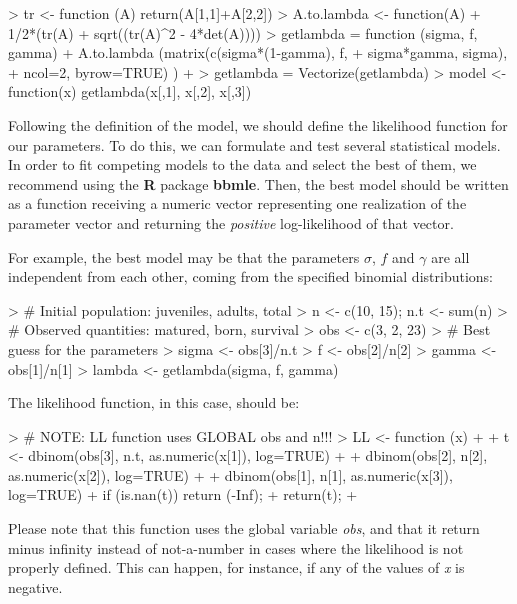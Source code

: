 \documentclass[twoside,12pt,a4paper]{article}
\newcommand{\R}{\textnormal{\sffamily\bfseries R}\xspace}
\begin{document}
\begin{Schunk}
\begin{Sinput}
> tr <- function (A) return(A[1,1]+A[2,2])
> A.to.lambda <- function(A) 
+   1/2*(tr(A) + sqrt((tr(A)^2 - 4*det(A))))
> getlambda = function (sigma, f, gamma) {
+   A.to.lambda (matrix(c(sigma*(1-gamma), f, 
+                         sigma*gamma, sigma), 
+                       ncol=2, byrow=TRUE) )
+ }
> getlambda = Vectorize(getlambda)
> model <- function(x) getlambda(x[,1], x[,2], x[,3])
\end{Sinput}
\end{Schunk}

Following the definition of the model, we should define the likelihood function for our parameters.
To do this, we can formulate and test several statistical models. In order to fit competing models to the 
data and select the best of them, we recommend using the \R package \textbf{bbmle}.
Then, the best model should be written as a function receiving a numeric vector representing one realization
of the parameter vector and returning the {\em positive} log-likelihood of that vector.

For example, the best model may be that the parameters $\sigma$, $f$ and $\gamma$ are all independent 
from each other, coming from the specified binomial distributions:

\begin{Schunk}
\begin{Sinput}
> # Initial population: juveniles, adults, total
> n <- c(10, 15); n.t <- sum(n)
> # Observed quantities: matured, born, survival
> obs <- c(3, 2, 23)
> # Best guess for the parameters
> sigma <- obs[3]/n.t
> f <- obs[2]/n[2]
> gamma <- obs[1]/n[1]
> lambda <- getlambda(sigma, f, gamma)
\end{Sinput}
\end{Schunk}

The likelihood function, in this case, should be:

\begin{Schunk}
\begin{Sinput}
> # NOTE: LL function uses GLOBAL obs and n!!!
> LL <- function (x) 
+ {
+   t <- dbinom(obs[3], n.t, as.numeric(x[1]), log=TRUE) +
+     dbinom(obs[2], n[2], as.numeric(x[2]), log=TRUE) +
+     dbinom(obs[1], n[1], as.numeric(x[3]), log=TRUE)
+   if (is.nan(t)) return (-Inf);
+   return(t);
+ }
\end{Sinput}
\end{Schunk}

Please note that this function uses the global variable {\em obs}, and that it return minus infinity instead
of not-a-number in cases where the likelihood is not properly defined. This can happen, for instance, if
any of the values of {\em x} is negative.
\end{document}
